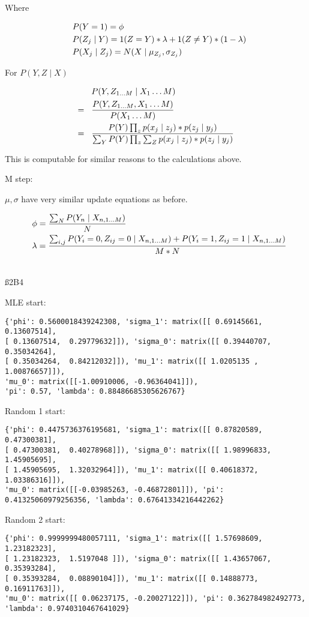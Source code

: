Where

\begin{align*}
& P(Y=1) = \phi \\ \hspace{3 mm} &
P(Z_j \mid Y) = 1(Z=Y)*\lambda + 1(Z \neq Y) * (1-\lambda) \\ \hspace{3 mm} &
P(X_j \mid Z_j) = N(X \mid \mu_{Z_j}, \sigma_{Z_j})
\end{align*}

For $P(Y,Z \mid X)$

\begin{align*}
& P(Y,Z_{1\dots M} \mid X_1\dots M) \\ = \hspace{3 mm} &
\frac{P(Y,Z_{1\dots M}, X_1\dots M)}{P( X_1\dots M)} \\ = \hspace{3 mm} &
\frac{P(Y) \prod_{z} p(x_{j} \mid z_{j}) * p(z_{j} \mid y_{j})}{\sum_Y P(Y) \prod_{z} \sum_{Z} p(x_{j} \mid z_{j}) * p(z_{j} \mid y_{j})}
\end{align*}

This is computable for similar reasons to the calculations above.

M step:

$\mu, \sigma$ have very similar update equations as before.

\begin{align*}
& \phi = \frac{\sum_N P(Y_n \mid X_{n,1 \dots M})}{N} \\ \hspace{3 mm} &
\lambda = \frac{\sum_{i,j} P(Y_i=0, Z_{ij}=0 \mid X_{n,1 \dots M}) + P(Y_i=1, Z_{ij}=1 \mid X_{n,1 \dots M})}{M*N} \\ \hspace{3 mm} &
\end{align*}

\ss{2B4}


MLE start: 
\begin{verbatim}
{'phi': 0.5600018439242308, 'sigma_1': matrix([[ 0.69145661,  0.13607514],
[ 0.13607514,  0.29779632]]), 'sigma_0': matrix([[ 0.39440707,  0.35034264],
[ 0.35034264,  0.84212032]]), 'mu_1': matrix([[ 1.0205135 ,  1.00876657]]),
'mu_0': matrix([[-1.00910006, -0.96364041]]),
'pi': 0.57, 'lambda': 0.88486685305626767}
\end{verbatim}

Random 1 start:
\begin{verbatim}
{'phi': 0.4475736376195681, 'sigma_1': matrix([[ 0.87820589,  0.47300381],
[ 0.47300381,  0.40278968]]), 'sigma_0': matrix([[ 1.98996833,  1.45905695],
[ 1.45905695,  1.32032964]]), 'mu_1': matrix([[ 0.40618372,  1.03386316]]),
'mu_0': matrix([[-0.03985263, -0.46872801]]), 'pi': 0.41325060979256356, 'lambda': 0.67641334216442262}
\end{verbatim}

Random 2 start:
\begin{verbatim}
{'phi': 0.9999999480057111, 'sigma_1': matrix([[ 1.57698609,  1.23182323],
[ 1.23182323,  1.5197048 ]]), 'sigma_0': matrix([[ 1.43657067,  0.35393284],
[ 0.35393284,  0.08890104]]), 'mu_1': matrix([[ 0.14888773,  0.16911763]]),
'mu_0': matrix([[ 0.06237175, -0.20027122]]), 'pi': 0.362784982492773,
'lambda': 0.9740310467641029}
\end{verbatim}

